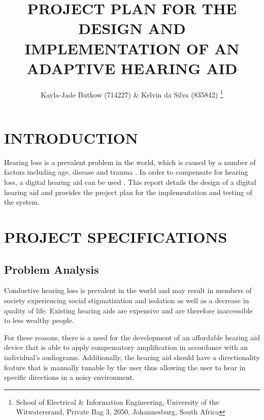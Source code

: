 \documentclass[10pt,twocolumn]{witseiepaper}
\begin{document}
\title{PROJECT PLAN FOR THE DESIGN AND IMPLEMENTATION OF AN ADAPTIVE HEARING AID}

\author{Kayla-Jade Butkow (714227) \& Kelvin da Silva (835842) 
\thanks{School of Electrical \& Information Engineering, University of the
Witwatersrand, Private Bag 3, 2050, Johannesburg, South Africa}
}


%


\maketitle
\thispagestyle{empty}
\pagestyle{plain}
\setcounter{page}{1}

%
\section{INTRODUCTION}
Hearing loss is a prevalent problem in the world, which is caused by a number of factors including age, disease and trauma \cite{Evaluation_of_a_hearing_compensation_algorithm}. In order to compensate for hearing loss, a digital hearing aid can be used \cite{Evaluation_of_a_hearing_compensation_algorithm}. This report details the design of a digital hearing aid and provides the project plan for the implementation and testing of the system. 

\section{PROJECT SPECIFICATIONS}
\subsection{Problem Analysis}
Conductive hearing loss is prevalent in the world and may result in members of society experiencing social stigmatization and isolation as well as a decrease in quality of life. Existing hearing aids are expensive and are therefore inaccessible to less wealthy people.

For these reasons, there is a need for the development of an affordable hearing aid device that is able to apply compensatory amplification in accordance with an individual's audiograms. Additionally, the hearing aid should have a directionality feature that is manually tunable by the user thus allowing the user to hear in specific directions in a noisy environment. 
\end{document}
